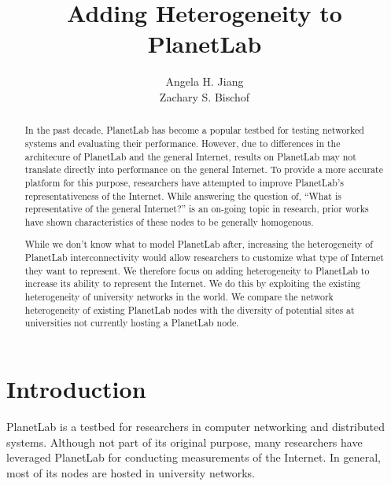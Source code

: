 \documentclass{sig-alternate-10pt}
\begin{document}
\title{Adding Heterogeneity to PlanetLab}

\author{
\alignauthor
Angela H. Jiang\\
\alignauthor
Zachary S. Bischof\\
}


\maketitle
\begin{abstract}

In the past decade, PlanetLab has become a popular testbed for testing
networked systems and evaluating their performance. However, due to differences
in the architecure of PlanetLab and the general Internet, results on PlanetLab
may not translate directly into performance on the general Internet.  To
provide a more accurate platform for this purpose, researchers have attempted
to improve PlanetLab's representativeness of the Internet. While answering the
question of, ``What is representative of the general Internet?'' is an on-going
topic in research, prior works have shown characteristics of these nodes to be
generally homogenous. 


While we don't know what to model PlanetLab after, increasing the heterogeneity
of PlanetLab interconnectivity would allow researchers to customize what type
of Internet they want to represent.  We therefore focus on adding heterogeneity
to PlanetLab to increase its ability to represent the Internet.  We do this by
exploiting the existing heterogeneity of university networks in the world. We
compare the network heterogeneity of existing PlanetLab nodes with the
diversity of potential sites at universities not currently hosting a PlanetLab
node.

\end{abstract}

\section{Introduction}

PlanetLab is a testbed for researchers in computer networking and distributed
systems. Although not part of its original purpose, many researchers have
leveraged PlanetLab for conducting measurements of the Internet.  In general,
most of its nodes are hosted in university networks.
\end{document}
